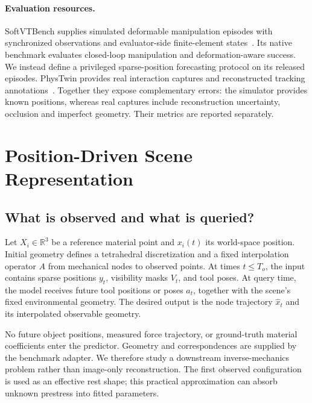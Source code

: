 \documentclass[10pt,twocolumn,letterpaper]{article}
\newcommand{\R}{\mathbb{R}}
\begin{document}
\paragraph{Evaluation resources.}
SoftVTBench supplies simulated deformable manipulation episodes with synchronized observations and evaluator-side finite-element states~\cite{jing2026softvt}. Its native benchmark evaluates closed-loop manipulation and deformation-aware success. We instead define a privileged sparse-position forecasting protocol on its released episodes. PhysTwin provides real interaction captures and reconstructed tracking annotations~\cite{jiang2025phystwin}. Together they expose complementary errors: the simulator provides known positions, whereas real captures include reconstruction uncertainty, occlusion and imperfect geometry. Their metrics are reported separately.

\section{Position-Driven Scene Representation}
\subsection{What is observed and what is queried?}
Let $X_i\in\R^3$ be a reference material point and $x_i(t)$ its world-space position. Initial geometry defines a tetrahedral discretization and a fixed interpolation operator $A$ from mechanical nodes to observed points. At times $t\leq T_o$, the input contains sparse positions $y_t$, visibility masks $V_t$, and tool poses. At query time, the model receives future tool positions or poses $a_t$, together with the scene's fixed environmental geometry. The desired output is the node trajectory $\hat x_t$ and its interpolated observable geometry.

No future object positions, measured force trajectory, or ground-truth material coefficients enter the predictor. Geometry and correspondences are supplied by the benchmark adapter. We therefore study a downstream inverse-mechanics problem rather than image-only reconstruction. The first observed configuration is used as an effective rest shape; this practical approximation can absorb unknown prestress into fitted parameters.
\end{document}
